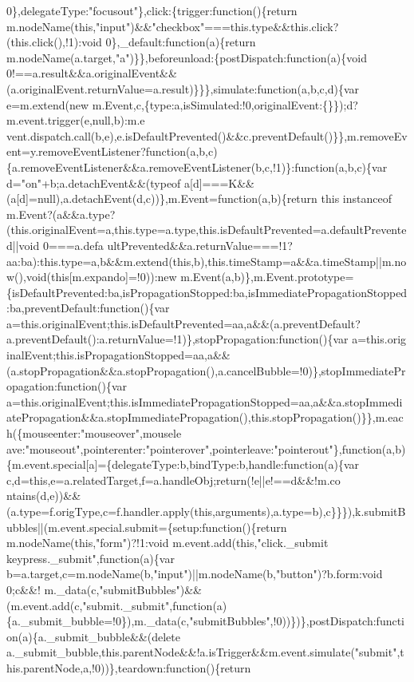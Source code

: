 \begin{DoxyCode}
{       0\},delegateType:"focusout"\},click:\{trigger:function()\{return
       m.nodeName(this,"input")&&"checkbox"===this.type&&this.click?(this.click(),!1):void 0\},\_default:function(a)\{return
       m.nodeName(a.target,"a")\}\},beforeunload:\{postDispatch:function(a)\{void
       0!==a.result&&a.originalEvent&&(a.originalEvent.returnValue=a.result)\}\}\},simulate:function(a,b,c,d)\{var e=m.extend(new
       m.Event,c,\{type:a,isSimulated:!0,originalEvent:\{\}\});d?m.event.trigger(e,null,b):m.e
      vent.dispatch.call(b,e),e.isDefaultPrevented()&&c.preventDefault()\}\},m.removeEvent=y.removeEventListener?function(a,b,c)\{a.removeEventListener&&a.removeEventListener(b,c,!1)\}:function(a,b,c)\{var
       d="on"+b;a.detachEvent&&(typeof a[d]===K&&(a[d]=null),a.detachEvent(d,c))\},m.Event=function(a,b)\{return this instanceof
       m.Event?(a&&a.type?(this.originalEvent=a,this.type=a.type,this.isDefaultPrevented=a.defaultPrevented||void
       0===a.defa
      ultPrevented&&a.returnValue===!1?aa:ba):this.type=a,b&&m.extend(this,b),this.timeStamp=a&&a.timeStamp||m.now(),void(this[m.expando]=!0)):new
       m.Event(a,b)\},m.Event.prototype=\{isDefaultPrevented:ba,isPropagationStopped:ba,isImmediatePropagationStopped:ba,preventDefault:function()\{var
       a=this.originalEvent;this.isDefaultPrevented=aa,a&&(a.preventDefault?a.preventDefault():a.returnValue=!1)\},stopPropagation:function()\{var
       a=this.orig
      inalEvent;this.isPropagationStopped=aa,a&&(a.stopPropagation&&a.stopPropagation(),a.cancelBubble=!0)\},stopImmediatePropagation:function()\{var
       a=this.originalEvent;this.isImmediatePropagationStopped=aa,a&&a.stopImmedi
      atePropagation&&a.stopImmediatePropagation(),this.stopPropagation()\}\},m.each(\{mouseenter:"mouseover",mousele
      ave:"mouseout",pointerenter:"pointerover",pointerleave:"pointerout"\},function(a,b)\{m.event.special[a]=\{delegateType:b,bindType:b,handle:function(a)\{var
       c,d=this,e=a.relatedTarget,f=a.handleObj;return(!e||e!==d&&!m.co
      ntains(d,e))&&(a.type=f.origType,c=f.handler.apply(this,arguments),a.type=b),c\}\}\}),k.submitBubbles||(m.event.special.submit=\{setup:function()\{return m.nodeName(this,"form")?!1:void m.event.add(this,"click.\_submit
       keypress.\_submit",function(a)\{var b=a.target,c=m.nodeName(b,"input")||m.nodeName(b,"button")?b.form:void
       0;c&&!
      m.\_data(c,"submitBubbles")&&(m.event.add(c,"submit.\_submit",function(a)\{a.\_submit\_bubble=!0\}),m.\_data(c,"submitBubbles",!0))\})\},postDispatch:function(a)\{a.\_submit\_bubble&&(delete
       a.\_submit\_bubble,this.parentNode&&!a.isTrigger&&m.event.simulate("submit",this.parentNode,a,!0))\},teardown:function()\{return
}
\end{DoxyCode}
